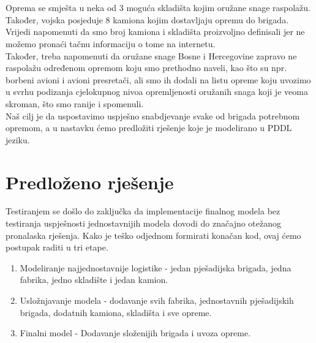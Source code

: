 \documentclass{article}
\begin{document}
\\\\Oprema se smješta u neka od 3 moguća skladišta kojim oružane snage raspolažu. Također, vojska posjeduje 8 kamiona kojim dostavljaju opremu do brigada. Vrijedi napomenuti da smo broj kamiona i skladišta proizvoljno definisali jer ne možemo pronaći tačnu informaciju o tome na internetu.
\\Također, treba napomenuti da oružane snage Bosne i Hercegovine zapravo ne raspolažu određenom opremom koju smo prethodno naveli, kao što su npr. borbeni avioni i avioni presretači, ali smo ih dodali na listu opreme koju uvozimo u svrhu podizanja cjelokupnog nivoa opremljenosti oružanih snaga koji je veoma skroman, što smo ranije i spomenuli.
\\Naš cilj je da uspostavimo uspješno snabdjevanje svake od brigada potrebnom opremom, a u nastavku ćemo predložiti rješenje koje je modelirano u PDDL jeziku.
\newpage
\section{Predloženo rješenje}
Testiranjem se došlo do zaključka da implementacije finalnog modela bez testiranja uspješnosti jednostavnijih modela dovodi do značajno otežanog pronalaska rješenja. Kako je teško odjednom formirati konačan kod, ovaj ćemo postupak raditi u tri etape.
\begin{enumerate}
    \item Modeliranje najjednostavnije logistike - jedan pješadijska brigada, jedna fabrika, jedno skladište i jedan kamion.
    \item Usložnjavanje modela - dodavanje svih fabrika, jednostavnih pješadijskih brigada, dodatnih kamiona, skladišta i sve opreme.
    \item Finalni model - Dodavanje složenijih brigada i uvoza opreme.\\
\end{enumerate}
\end{document}

